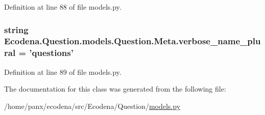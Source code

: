 Definition at line 88 of file models.py.

\hypertarget{class_ecodena_1_1_question_1_1models_1_1_question_1_1_meta_aa9d8ba6465bbcd410a41f58cb33daaa8}{
\subsubsection[{verbose\_\-name\_\-plural}]{\setlength{\rightskip}{0pt plus 5cm}string {\bf Ecodena.Question.models.Question.Meta.verbose\_\-name\_\-plural} = 'questions'}}
\label{d6/da7/class_ecodena_1_1_question_1_1models_1_1_question_1_1_meta_aa9d8ba6465bbcd410a41f58cb33daaa8}


Definition at line 89 of file models.py.



The documentation for this class was generated from the following file:\begin{DoxyCompactItemize}
\item 
/home/panx/ecodena/src/Ecodena/Question/\hyperlink{_question_2models_8py}{models.py}\end{DoxyCompactItemize}
